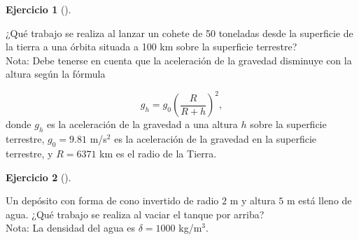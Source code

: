 \documentclass[
  a4paper,
]{scrreport}
\theoremstyle{definition}
\newtheorem{exercise}{Ejercicio}[chapter]
\theoremstyle{remark}
\begin{document}
\begin{exercise}[]\protect\hypertarget{exr-trabajo-cohete}{}\label{exr-trabajo-cohete}

¿Qué trabajo se realiza al lanzar un cohete de 50 toneladas desde la
superficie de la tierra a una órbita situada a 100 km sobre la
superficie terrestre?\\
Nota: Debe tenerse en cuenta que la aceleración de la gravedad disminuye
con la altura según la fórmula

\[
g_h = g_0 \left(\frac{R}{R+h}\right)^2,
\] donde \(g_h\) es la aceleración de la gravedad a una altura \(h\)
sobre la superficie terrestre, \(g_0=9.81\) m/s\(^2\) es la aceleración
de la gravedad en la superficie terrestre, y \(R=6371\) km es el radio
de la Tierra.

\end{exercise}

\begin{tcolorbox}[enhanced jigsaw, left=2mm, coltitle=black, colbacktitle=quarto-callout-tip-color!10!white, opacitybacktitle=0.6, colback=white, breakable, titlerule=0mm, toptitle=1mm, rightrule=.15mm, bottomtitle=1mm, bottomrule=.15mm, toprule=.15mm, leftrule=.75mm, arc=.35mm, opacityback=0, title=\textcolor{quarto-callout-tip-color}{\faLightbulb}\hspace{0.5em}{Solución}, colframe=quarto-callout-tip-color-frame]

\end{tcolorbox}

\begin{exercise}[]\protect\hypertarget{exr-trabajo-deposito}{}\label{exr-trabajo-deposito}

Un depósito con forma de cono invertido de radio \(2\) m y altura \(5\)
m está lleno de agua. ¿Qué trabajo se realiza al vaciar el tanque por
arriba?\\
Nota: La densidad del agua es \(\delta = 1000\) kg/m\(^3\).

\end{exercise}
\end{document}
